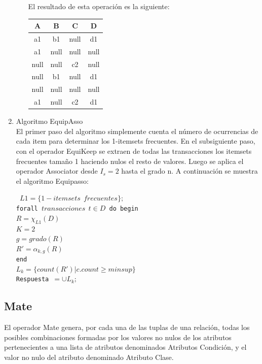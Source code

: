 \begin{enumerate}
\begin{enumerate}
El resultado de esta operaci\'on es la siguiente:

\begin{center}
\begin{tabular}{|c|c|c|c|}\hline
\textbf{A} & \textbf{B} & \textbf{C} & \textbf{D}\\ \hline
a1   & b1   & null & d1\\ \hline
a1   & null & null & null\\ \hline
null & null & c2   & null\\ \hline
null & b1   & null & d1\\ \hline
null & null & null & null\\ \hline
a1   & null & c2   & d1\\ \hline
\end{tabular}
\end{center}

\end{enumerate}
\item Algoritmo EquipAsso\\
El primer paso del algoritmo simplemente cuenta el n\'umero de ocurrencias de cada item para determinar los
1-itemsets frecuentes. En el subsiguiente paso, con el operador EquiKeep se extraen de todas las
transacciones los itemsets frecuentes tama\~no 1 haciendo nulos el resto de valores. Luego se aplica el operador
Associator desde $I_{s}=2$ hasta el grado n. A continuaci\'on se muestra el algoritmo Equipasso:

\begin{footnotesize}
\texttt{
$L1=\{1-itemsets\ \ frecuentes\};$\\
forall $transacciones\ \ t\in D$ do begin\\
\indent $R=\chi_{L1}(D)$\\
\indent $K=2$\\
\indent $g=grado(R)$\\
\indent $R'=\alpha_{k,g}(R)$\\
end\\
$L_{k}=\{count(R')|c.count\geq minsup\}$\\
Respuesta $=\cup L_{k};$
}
\end{footnotesize}
\end{enumerate}

\subsection{Mate}
El operador Mate genera, por cada una de las tuplas de una relaci\'on, todas los posibles combinaciones formadas
por los valores no nulos de los atributos pertenecientes a una lista de atributos denominados Atributos
Condici\'on, y el valor no nulo del atributo denominado Atributo Clase.\\

